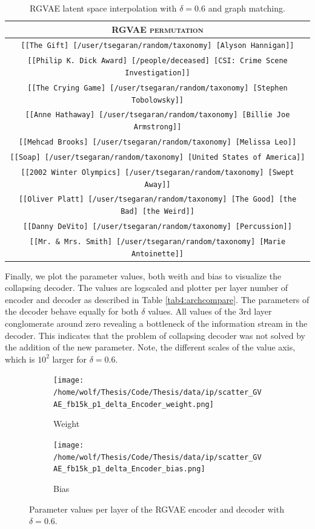 \begin{table}[H]
  \centering
  \begin{tabular}{|c|}
  \hline
  \rowcolor[HTML]{EFEFEF} 
  \textsc{RGVAE permutation}\\ \hline
  \texttt{[[The Gift] [/user/tsegaran/random/taxonomy] [Alyson Hannigan]]}\\
  \texttt{[[Philip K. Dick Award] [/people/deceased] [CSI: Crime Scene Investigation]]}\\
  \texttt{[[The Crying Game] [/user/tsegaran/random/taxonomy] [Stephen Tobolowsky]]}\\
  \texttt{[[Anne Hathaway] [/user/tsegaran/random/taxonomy] [Billie Joe Armstrong]]}\\
  \texttt{[[Mehcad Brooks] [/user/tsegaran/random/taxonomy] [Melissa Leo]]}\\
  \texttt{[[Soap] [/user/tsegaran/random/taxonomy] [United States of America]]}\\
  \texttt{[[2002 Winter Olympics] [/user/tsegaran/random/taxonomy] [Swept Away]]}\\
  \texttt{[[Oliver Platt] [/user/tsegaran/random/taxonomy] [The Good] [the Bad] [the Weird]]}\\
  \texttt{[[Danny DeVito] [/user/tsegaran/random/taxonomy] [Percussion]]}\\
  \texttt{[[Mr. \& Mrs. Smith] [/user/tsegaran/random/taxonomy] [Marie Antoinette]]}\\  \hline
  \end{tabular}
\caption{RGVAE latent space interpolation with $\delta = 0.6$ and graph matching.}
\label{tab5:ipbtw2Delta}
\end{table}

Finally, we plot the parameter values, both weith and bias to visualize the collapsing decoder. The values are logscaled and plotter per layer number of encoder and decoder as described in Table \ref{tab4:archcompare}. The parameters of the decoder behave equally for both $\delta$ values. All values of the 3rd layer conglomerate around zero revealing a bottleneck of the information stream in the decoder. This indicates that the problem of collapsing decoder was not solved by the addition of the new parameter. Note, the different scales of the value axis, which is $10^2$ larger for  $\delta = 0.6$.

\begin{figure}[H]
  \centering
  \begin{subfigure}{\textwidth}
    \texttt{[image: /home/wolf/Thesis/Code/Thesis/data/ip/scatter\_GVAE\_fb15k\_p1\_delta\_Encoder\_weight.png]}
    \caption{Weight}
    \label{fig5:deltaParamsW}
  \end{subfigure}
  \begin{subfigure}{\textwidth}
    \texttt{[image: /home/wolf/Thesis/Code/Thesis/data/ip/scatter\_GVAE\_fb15k\_p1\_delta\_Encoder\_bias.png]}
    \caption{Bias}
    \label{fig5:deltaParamsB}
  \end{subfigure}
\caption{Parameter values per layer of the RGVAE encoder and decoder with $\delta=0.6$.}
\label{fig5:deltaParams}
\end{figure}


